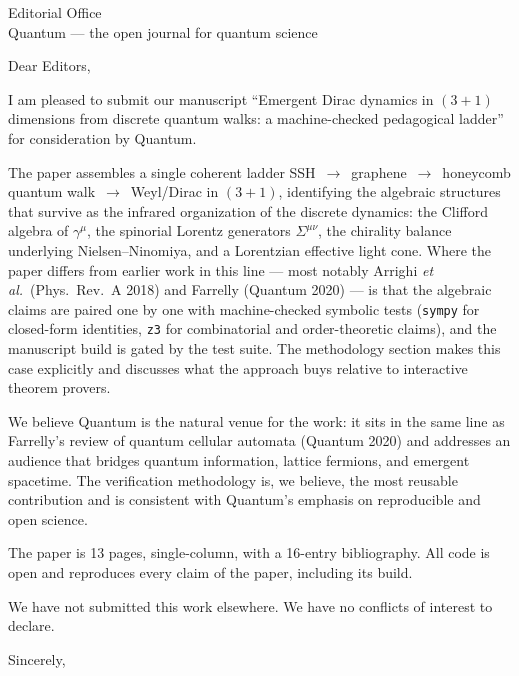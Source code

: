 \documentclass[11pt]{letter}
\begin{document}
\begin{letter}{Editorial Office \\ Quantum --- the open journal for quantum science}

\opening{Dear Editors,}

I am pleased to submit our manuscript ``Emergent Dirac dynamics in
$(3{+}1)$ dimensions from discrete quantum walks: a machine-checked
pedagogical ladder'' for consideration by Quantum.

The paper assembles a single coherent ladder
SSH~$\to$~graphene~$\to$~honeycomb quantum walk~$\to$~Weyl/Dirac in
$(3{+}1)$, identifying the algebraic structures that survive as the
infrared organization of the discrete dynamics: the Clifford algebra of
$\gamma^{\mu}$, the spinorial Lorentz generators $\Sigma^{\mu\nu}$, the
chirality balance underlying Nielsen--Ninomiya, and a Lorentzian
effective light cone. Where the paper differs from earlier work in this
line --- most notably Arrighi \emph{et al.}\ (Phys.\ Rev.\ A 2018) and
Farrelly (Quantum 2020) --- is that the algebraic claims are paired one
by one with machine-checked symbolic tests (\texttt{sympy} for
closed-form identities, \texttt{z3} for combinatorial and
order-theoretic claims), and the manuscript build is gated by the test
suite. The methodology section makes this case explicitly and discusses
what the approach buys relative to interactive theorem provers.

We believe Quantum is the natural venue for the work: it sits in the
same line as Farrelly's review of quantum cellular automata (Quantum
2020) and addresses an audience that bridges quantum information, lattice
fermions, and emergent spacetime. The verification methodology is, we
believe, the most reusable contribution and is consistent with Quantum's
emphasis on reproducible and open science.

The paper is 13 pages, single-column, with a 16-entry bibliography. All
code is open and reproduces every claim of the paper, including its
build.

We have not submitted this work elsewhere. We have no conflicts of
interest to declare.

\closing{Sincerely,}

\end{letter}
\end{document}
